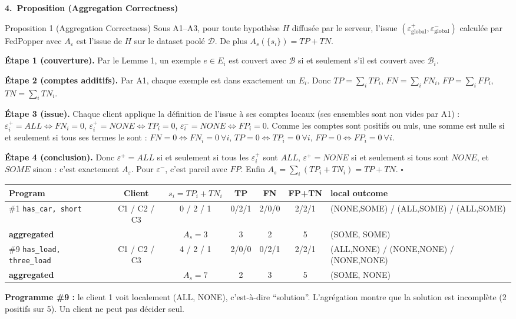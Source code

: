 \documentclass[10pt]{article}
\newcommand{\titrebox}[2]{\needspace{10\baselineskip}\vspace{8pt}
  \begin{tcolorbox}[colback=marine, colframe=marine, arc=0pt, boxrule=0pt,
    top=4pt, bottom=4pt, left=8pt]
  \color{white}\Large\bfseries #1.~#2
  \end{tcolorbox}\vspace{2pt}}
\newcommand{\st}[1]{\par\needspace{7\baselineskip}\vspace{5pt}{\normalsize\bfseries\textcolor{marine}{#1}}\par\vspace{2pt}}
\begin{document}
\titrebox{4}{Proposition (Aggregation Correctness)}
\begin{enonce}{Proposition 1 (Aggregation Correctness)}
Sous A1--A3, pour toute hypothèse $H$ diffusée par le serveur, l'issue $(\varepsilon^+_{\mathrm{global}},\varepsilon^-_{\mathrm{global}})$ calculée
par FedPopper avec $A_\varepsilon$ est l'issue de $H$ sur le dataset poolé $\mathcal{D}$. De plus $A_s(\{s_i\})=TP+TN$.
\end{enonce}

\st{Proof, étape par étape}
\textbf{Étape 1 (couverture).} Par le Lemme 1, un exemple $e\in E_i$ est couvert avec $\mathcal{B}$ si et seulement s'il est couvert avec $\mathcal{B}_i$.

\textbf{Étape 2 (comptes additifs).} Par A1, chaque exemple est dans exactement un $E_i$. Donc
$TP=\sum_iTP_i$, $FN=\sum_iFN_i$, $FP=\sum_iFP_i$, $TN=\sum_iTN_i$.

\textbf{Étape 3 (issue).} Chaque client applique la définition de l'issue à ses comptes locaux (ses ensembles sont non vides par A1) :
$\varepsilon_i^+=\mathit{ALL}\iff FN_i=0$, $\varepsilon_i^+=\mathit{NONE}\iff TP_i=0$, $\varepsilon_i^-=\mathit{NONE}\iff FP_i=0$.
Comme les comptes sont positifs ou nuls, une somme est nulle si et seulement si tous ses termes le sont :
$FN=0\iff FN_i=0\ \forall i$, $TP=0\iff TP_i=0\ \forall i$, $FP=0\iff FP_i=0\ \forall i$.

\textbf{Étape 4 (conclusion).} Donc $\varepsilon^+=\mathit{ALL}$ si et seulement si tous les $\varepsilon_i^+$ sont $\mathit{ALL}$, $\varepsilon^+=\mathit{NONE}$ si et seulement si tous sont $\mathit{NONE}$,
et $\mathit{SOME}$ sinon : c'est exactement $A_\varepsilon$. Pour $\varepsilon^-$, c'est pareil avec $FP$. Enfin
$A_s=\sum_i(TP_i+TN_i)=TP+TN$. \hfill $\square$

\st{Vérification sur Trains}
\begin{tabular}{@{}l c c c c c l@{}}
\textbf{Program} & \textbf{Client} & $s_i=TP_i+TN_i$ & TP & FN & FP+TN & \textbf{local outcome}\\\hline
\#1 \texttt{has\_car, short} & C1 / C2 / C3 & 0 / 2 / 1 & 0/2/1 & 2/0/0 & 2/2/1 & (NONE,SOME) / (ALL,SOME) / (ALL,SOME)\\
\textbf{aggregated} & & $A_s=3$ & 3 & 2 & 5 & (SOME, SOME)\\\hline
\#9 \texttt{has\_load, three\_load} & C1 / C2 / C3 & 4 / 2 / 1 & 2/0/0 & 0/2/1 & 2/2/1 & (ALL,NONE) / (NONE,NONE) / (NONE,NONE)\\
\textbf{aggregated} & & $A_s=7$ & 2 & 3 & 5 & (SOME, NONE)\\
\end{tabular}
\begin{piege}
\textbf{Programme \#9 :} le client 1 voit localement (ALL, NONE), c'est-à-dire ``solution''. L'agrégation montre que la solution est incomplète
(2 positifs sur 5). Un client ne peut pas décider seul.
\end{piege}
\end{document}
